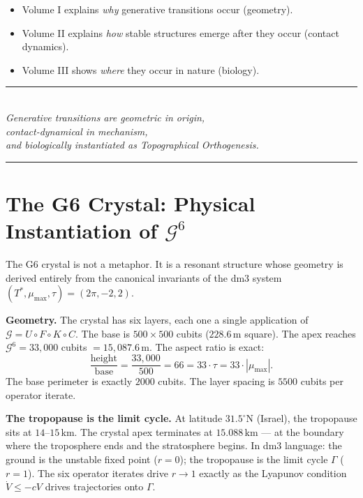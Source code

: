 \documentclass[12pt, oneside]{book}
\theoremstyle{plain}
\theoremstyle{definition}
\theoremstyle{remark}
\newcommand{\Orb}{\Gamma}
\begin{document}
\begin{itemize}
\item Volume I explains \emph{why} generative transitions occur (geometry).
\item Volume II explains \emph{how} stable structures emerge after they occur
      (contact dynamics).
\item Volume III shows \emph{where} they occur in nature (biology).
\end{itemize}

\begin{center}
\rule{0.5\textwidth}{0.4pt}\\[0.6em]
\textit{Generative transitions are geometric in origin,\\
contact-dynamical in mechanism,\\
and biologically instantiated as Topographical Orthogenesis.}\\[0.6em]
\rule{0.5\textwidth}{0.4pt}
\end{center}


\section*{The G6 Crystal: Physical Instantiation of $\mathcal{G}^6$}

The G6 crystal is not a metaphor.
It is a resonant structure whose geometry is derived entirely from
the canonical invariants of the dm3 system
$(T^*, \mu_{\max}, \tau) = (2\pi, -2, 2)$.

\textbf{Geometry.}
The crystal has six layers, each one a single application of
$\mathcal{G} = U \circ F \circ K \circ C$.
The base is $500 \times 500$ cubits ($228.6\,\mathrm{m}$ square).
The apex reaches $\mathcal{G}^6 = 33{,}000$ cubits $= 15{,}087.6\,\mathrm{m}$.
The aspect ratio is exact:
\[
\frac{\text{height}}{\text{base}} = \frac{33{,}000}{500} = 66
= 33 \cdot \tau = 33 \cdot |\mu_{\max}|.
\]
The base perimeter is exactly $2000$ cubits.
The layer spacing is $5500$ cubits per operator iterate.

\textbf{The tropopause is the limit cycle.}
At latitude $31.5^\circ$N (Israel), the tropopause sits at
$14$--$15\,\mathrm{km}$.
The crystal apex terminates at $15.088\,\mathrm{km}$ ---
at the boundary where the troposphere ends and the stratosphere begins.
In dm3 language: the ground is the unstable fixed point ($r = 0$);
the tropopause is the limit cycle $\Orb$ ($r = 1$).
The six operator iterates drive $r \to 1$ exactly as the
Lyapunov condition $\dot{V} \leq -cV$ drives trajectories onto $\Orb$.
\end{document}
